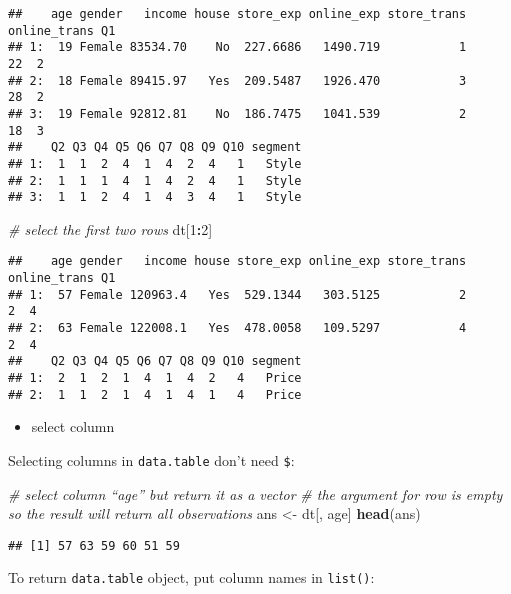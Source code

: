 \documentclass[
]{article}
\newenvironment{Shaded}{\begin{snugshade}}{\end{snugshade}}
\newcommand{\CommentTok}[1]{\textcolor[rgb]{0.56,0.35,0.01}{\textit{#1}}}
\newcommand{\DecValTok}[1]{\textcolor[rgb]{0.00,0.00,0.81}{#1}}
\newcommand{\KeywordTok}[1]{\textcolor[rgb]{0.13,0.29,0.53}{\textbf{#1}}}
\newcommand{\NormalTok}[1]{#1}
\newcommand{\OperatorTok}[1]{\textcolor[rgb]{0.81,0.36,0.00}{\textbf{#1}}}
\newcommand{\StringTok}[1]{\textcolor[rgb]{0.31,0.60,0.02}{#1}}
\providecommand{\tightlist}{%
  \setlength{\itemsep}{0pt}\setlength{\parskip}{0pt}}
\begin{document}
\begin{verbatim}
##    age gender   income house store_exp online_exp store_trans online_trans Q1
## 1:  19 Female 83534.70    No  227.6686   1490.719           1           22  2
## 2:  18 Female 89415.97   Yes  209.5487   1926.470           3           28  2
## 3:  19 Female 92812.81    No  186.7475   1041.539           2           18  3
##    Q2 Q3 Q4 Q5 Q6 Q7 Q8 Q9 Q10 segment
## 1:  1  1  2  4  1  4  2  4   1   Style
## 2:  1  1  1  4  1  4  2  4   1   Style
## 3:  1  1  2  4  1  4  3  4   1   Style
\end{verbatim}

\begin{Shaded}
\begin{Highlighting}[]
\CommentTok{# select the first two rows}
\NormalTok{dt[}\DecValTok{1}\OperatorTok{:}\DecValTok{2}\NormalTok{]}
\end{Highlighting}
\end{Shaded}

\begin{verbatim}
##    age gender   income house store_exp online_exp store_trans online_trans Q1
## 1:  57 Female 120963.4   Yes  529.1344   303.5125           2            2  4
## 2:  63 Female 122008.1   Yes  478.0058   109.5297           4            2  4
##    Q2 Q3 Q4 Q5 Q6 Q7 Q8 Q9 Q10 segment
## 1:  2  1  2  1  4  1  4  2   4   Price
## 2:  1  1  2  1  4  1  4  1   4   Price
\end{verbatim}

\begin{itemize}
\tightlist
\item
  select column
\end{itemize}

Selecting columns in \texttt{data.table} don't need \texttt{\$}:

\begin{Shaded}
\begin{Highlighting}[]
\CommentTok{# select column “age” but return it as a vector}
\CommentTok{# the argument for row is empty so the result will return all observations}
\NormalTok{ans <-}\StringTok{ }\NormalTok{dt[, age]}
\KeywordTok{head}\NormalTok{(ans)}
\end{Highlighting}
\end{Shaded}

\begin{verbatim}
## [1] 57 63 59 60 51 59
\end{verbatim}

To return \texttt{data.table} object, put column names in
\texttt{list()}:
\end{document}
